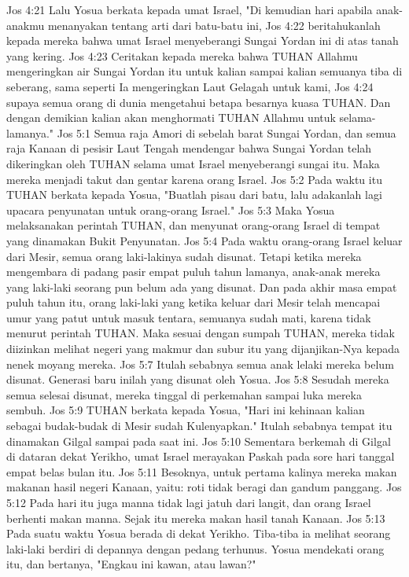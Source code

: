 Jos 4:21  Lalu Yosua berkata kepada umat Israel, "Di kemudian hari apabila anak-anakmu menanyakan tentang arti dari batu-batu ini,
Jos 4:22  beritahukanlah kepada mereka bahwa umat Israel menyeberangi Sungai Yordan ini di atas tanah yang kering.
Jos 4:23  Ceritakan kepada mereka bahwa TUHAN Allahmu mengeringkan air Sungai Yordan itu untuk kalian sampai kalian semuanya tiba di seberang, sama seperti Ia mengeringkan Laut Gelagah untuk kami,
Jos 4:24  supaya semua orang di dunia mengetahui betapa besarnya kuasa TUHAN. Dan dengan demikian kalian akan menghormati TUHAN Allahmu untuk selama-lamanya."
Jos 5:1  Semua raja Amori di sebelah barat Sungai Yordan, dan semua raja Kanaan di pesisir Laut Tengah mendengar bahwa Sungai Yordan telah dikeringkan oleh TUHAN selama umat Israel menyeberangi sungai itu. Maka mereka menjadi takut dan gentar karena orang Israel.
Jos 5:2  Pada waktu itu TUHAN berkata kepada Yosua, "Buatlah pisau dari batu, lalu adakanlah lagi upacara penyunatan untuk orang-orang Israel."
Jos 5:3  Maka Yosua melaksanakan perintah TUHAN, dan menyunat orang-orang Israel di tempat yang dinamakan Bukit Penyunatan.
Jos 5:4  Pada waktu orang-orang Israel keluar dari Mesir, semua orang laki-lakinya sudah disunat. Tetapi ketika mereka mengembara di padang pasir empat puluh tahun lamanya, anak-anak mereka yang laki-laki seorang pun belum ada yang disunat. Dan pada akhir masa empat puluh tahun itu, orang laki-laki yang ketika keluar dari Mesir telah mencapai umur yang patut untuk masuk tentara, semuanya sudah mati, karena tidak menurut perintah TUHAN. Maka sesuai dengan sumpah TUHAN, mereka tidak diizinkan melihat negeri yang makmur dan subur itu yang dijanjikan-Nya kepada nenek moyang mereka.
Jos 5:7  Itulah sebabnya semua anak lelaki mereka belum disunat. Generasi baru inilah yang disunat oleh Yosua.
Jos 5:8  Sesudah mereka semua selesai disunat, mereka tinggal di perkemahan sampai luka mereka sembuh.
Jos 5:9  TUHAN berkata kepada Yosua, "Hari ini kehinaan kalian sebagai budak-budak di Mesir sudah Kulenyapkan." Itulah sebabnya tempat itu dinamakan Gilgal sampai pada saat ini.
Jos 5:10  Sementara berkemah di Gilgal di dataran dekat Yerikho, umat Israel merayakan Paskah pada sore hari tanggal empat belas bulan itu.
Jos 5:11  Besoknya, untuk pertama kalinya mereka makan makanan hasil negeri Kanaan, yaitu: roti tidak beragi dan gandum panggang.
Jos 5:12  Pada hari itu juga manna tidak lagi jatuh dari langit, dan orang Israel berhenti makan manna. Sejak itu mereka makan hasil tanah Kanaan.
Jos 5:13  Pada suatu waktu Yosua berada di dekat Yerikho. Tiba-tiba ia melihat seorang laki-laki berdiri di depannya dengan pedang terhunus. Yosua mendekati orang itu, dan bertanya, "Engkau ini kawan, atau lawan?"
